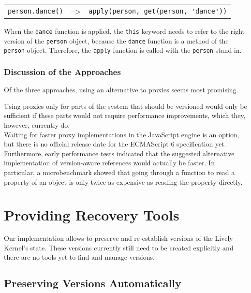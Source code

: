 \begin{center}
    \begin{tabular}{ lll }
    \lstinline|person.dance()| & --> & \lstinline|apply(person, get(person, 'dance'))| \\
    \end{tabular}
\end{center}

When the \lstinline{dance} function is applied, the \lstinline{this} keyword needs to refer to the right version of the \lstinline{person} object, because the \lstinline{dance} function is a method of the \lstinline{person} object.
Therefore, the \lstinline{apply} function is called with the \lstinline{person} stand-in.

\subsubsection{Discussion of the Approaches}

Of the three approaches, using an alternative to proxies seems most promising.

Using proxies only for parts of the system that should be versioned would only be sufficient if these parts would not require performance improvements, which they, however, currently do.\\
Waiting for faster proxy implementations in the JavaScript engine is an option, but there is no official release date for the ECMAScript 6 specification yet.\\
Furthermore, early performance tests indicated that the suggested alternative implementation of version-aware references would actually be faster.
In particular, a microbenchmark showed that going through a function to read a property of an object is only twice as expensive as reading the property directly.


\section{Providing Recovery Tools}

Our implementation allows to preserve and re-establish versions of the Lively Kernel's state.
These versions currently still need to be created explicitly and there are no tools yet to find and manage versions.


\subsection{Preserving Versions Automatically}

